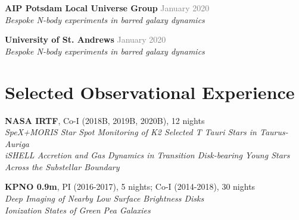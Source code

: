 \documentclass[margin, a4paper,11pt]{res} %
\begin{document}
\begin{resume}
{\bf AIP Potsdam Local Universe Group} \hfill\textcolor{grey}{January 2020}\\
{\it Bespoke N-body experiments in barred galaxy dynamics}

{\bf University of St. Andrews} \hfill\textcolor{grey}{January 2020}\\
{\it Bespoke N-body experiments in barred galaxy dynamics}










\section{\sc \textcolor{redshade}{Selected Observational Experience}}

{\bf NASA IRTF}, Co-I (2018B, 2019B, 2020B), 12 nights\\
{\it SpeX+MORIS Star Spot Monitoring of K2 Selected T Tauri Stars in Taurus-Auriga}\\
{\it iSHELL Accretion and Gas Dynamics in Transition Disk-bearing Young Stars Across the Substellar Boundary}

{\bf KPNO 0.9m}, PI (2016-2017), 5 nights; Co-I (2014-2018), 30 nights\\
{\it Deep Imaging of Nearby Low Surface Brightness Disks}\\
{\it Ionization States of Green Pea Galaxies}


\end{resume}
\end{document}

